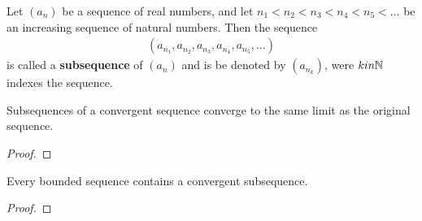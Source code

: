 \begin{definition}[Subsequence]
	Let $\left( a_n \right) $ be a sequence of real numbers, and let $n_{1} < n_2 < n_3 < n_4 < n_5 < \ldots$ be an increasing sequence of natural numbers. Then the sequence 
	\begin{align}
		\left( a_{n_{1}}, a_{n_{2}}, a_{n_{3}}, a_{n_{4}}, a_{n_{5}}, \ldots \right) 
	\end{align}
	is called a \textbf{subsequence} of $\left( a_n \right) $ and is be denoted by $\left( a_{n_{k}} \right) $, were $k in \mathbb{N}$ indexes the sequence.
\end{definition}

\begin{theorem}
	Subsequences of a convergent sequence converge to the same limit as the original sequence.
\end{theorem}

\begin{proof}
\end{proof}

\begin{theorem}
	Every bounded sequence contains a convergent subsequence. 	
\end{theorem}

\begin{proof}
\end{proof}


